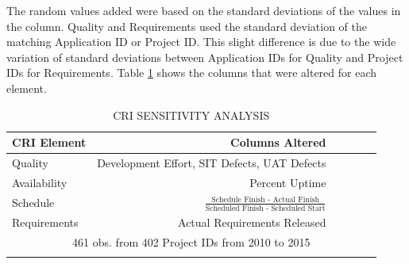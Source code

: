 \documentclass[SDSUThesis.tex]{subfiles}
\begin{document}
        The random values added were based on the standard 
        deviations of the values in the column.
        Quality and Requirements used the standard deviation of the
        matching Application ID or Project ID.  This slight difference
        is due to the wide variation of standard deviations between
        Application IDs for Quality and Project IDs for Requirements. 
        Table \ref{tab:sensitivity} shows the columns that were
        altered for each element.
        
        \begin{longtable}{@{}l rr rrr}
            \toprule%
             \centering%
             {\bfseries CRI Element}
             & {\bfseries Columns Altered } \\
            
            \cmidrule[0.2pt](r{0.125em}){1-1}%
            \cmidrule[0.2pt](lr{0.125em}){2-2}%
            \endhead
            
            Quality  & Development Effort, SIT Defects, UAT Defects \\
            \myrowcolour%
            Availability & Percent Uptime \\
            Schedule &  $\frac{\text{Schedule Finish - Actual Finish}}
                    {\text{Scheduled Finish - Scheduled Start}}$ \\
            \myrowcolour%
            Requirements & Actual Requirements Released \\
            
            \bottomrule
            
            \multicolumn{6}{c}{461 obs. from 402 Project IDs from 2010 to 2015} \\
            
            \caption{CRI SENSITIVITY ANALYSIS}
            \label{tab:sensitivity}
        \end{longtable}
\end{document}
